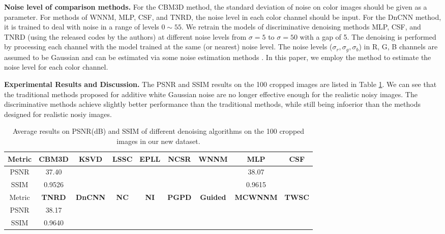 \textbf{Noise level of comparison methods.} For the CBM3D method, the standard deviation of noise on color images should be given as a parameter. For methods of WNNM, MLP, CSF, and TNRD, the noise level in each color channel should be input. For the DnCNN method, it is trained to deal with noise in a range of levels $0\sim55$. We retrain the models of discriminative denoising methods MLP, CSF, and TNRD (using the released codes by the authors) at different noise levels from $\sigma=5$ to $\sigma=50$ with a gap of 5. The denoising is performed by processing each channel with the model trained at the same (or nearest) noise level. The noise levels ($\sigma_{r}, \sigma_{g}, \sigma_{b}$) in R, G, B channels are assumed to be Gaussian and can be estimated via some noise estimation methods \cite{noiselevel,Chen2015ICCV}. In this paper, we employ the method \cite{noiselevel} to estimate the noise level for each color channel.


\textbf{Experimental Results and Discussion.}
The PSNR and SSIM \cite{ssim} results on the 100 cropped images are listed in Table \ref{tab6-1}. We can see that the traditional methods proposed for additive white Gaussian noise are no longer effective enough for the realistic noisy images. The discriminative methods achieve slightly better performance than the traditional methods, while still being infoerior than the methods designed for realistic nosiy images.

\begin{table}[hbp]
\caption{Average results on PSNR(dB) and SSIM of different denoising algorithms on the 100 cropped images in our new dataset.}
\scriptsize
\label{tab6-1}
\begin{center}
\renewcommand\arraystretch{1.2}
\begin{tabular*}{1\textwidth}{@{\extracolsep{\fill}}ccccccccc}
\hline
Metric
&
\textbf{CBM3D}
&
\textbf{KSVD}
&
\textbf{LSSC}
&
\textbf{EPLL}
&
\textbf{NCSR}
&
\textbf{WNNM}
&
\textbf{MLP}
&
\textbf{CSF}
\\
\hline
PSNR & 37.40 &  &  &  &  &  & 38.07 & 
\\
\hline
SSIM & 0.9526 &  &  &  &  &  & 0.9615 & 
\\
\hline
Metric
&
\textbf{TNRD}
&
\textbf{DnCNN}
&
\textbf{NC}
&
\textbf{NI}
&
\textbf{PGPD}
&
\textbf{Guided}
&
\textbf{MCWNNM}
&
\textbf{TWSC}
\\
\hline
PSNR & 38.17 &  &  &  &  &  &  & 
\\
\hline
SSIM & 0.9640 &  &  &  &  &  &  & 
\\
\hline
\end{tabular*}
\end{center}
\end{table}




